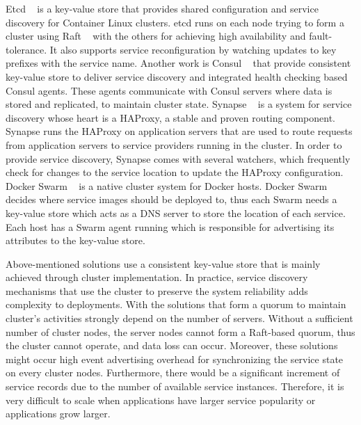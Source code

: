 Etcd ~\cite{etcd} is a key-value store that provides shared configuration and service discovery for Container Linux clusters. etcd runs on each node trying to form a cluster using Raft ~\cite{raft} with the others for achieving high availability and fault-tolerance. It also supports service reconfiguration by watching updates to key prefixes with the service name. Another work is Consul ~\cite{Consul} that provide consistent key-value store to deliver service discovery and integrated health checking based Consul agents. These agents communicate with Consul servers where data is stored and replicated, to maintain cluster state. Synapse ~\cite{Synapse} is a system for service discovery
whose heart is a HAProxy, a stable and proven routing component. Synapse runs the HAProxy on application servers that are used to route requests from application servers to service providers running in the cluster. In order to provide service discovery, Synapse comes with several watchers, which frequently check for changes to the service location to update the
HAProxy configuration. Docker Swarm ~\cite{swarm} is a native cluster system for Docker hosts. Docker Swarm decides where service images should be deployed to, thus each Swarm needs a key-value store which acts as a DNS server to store the location of each service. Each host has a Swarm agent running which is responsible for advertising its attributes to the key-value store.

Above-mentioned solutions use a consistent key-value store that is mainly achieved through cluster implementation. In practice, service discovery mechanisms that use the cluster to preserve the system reliability adds complexity to deployments. With the solutions that form a quorum to maintain cluster’s activities strongly depend on the number of servers. Without a sufficient number of cluster nodes, the server nodes cannot
form a Raft-based quorum, thus the cluster cannot operate, and data loss can occur. Moreover, these solutions might occur high event advertising overhead for synchronizing the service state on every cluster nodes. Furthermore, there would be a significant increment of service records due to the number of available service instances. Therefore, it is very difficult to scale when applications have larger service popularity or
applications grow larger.
